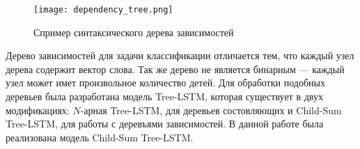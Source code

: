 \begin{figure}[h]
\centering
  \texttt{[image: dependency\_tree.png]}
  \caption{Спример синтаксического дерева зависимостей}\label{fig:overview:dependency_tree}
\end{figure}

Дерево зависимостей для задачи классификации отличается тем, что каждый узел дерева содержит вектор слова. Так же дерево не является бинарным --- каждый узел может имет произвольное количество детей. Для обработки подобных деревьев была разработана модель Tree-LSTM, которая существует в двух модификациях: $N$-арная Tree-LSTM, для деревьев состовляющих и Child-Sum Tree-LSTM, для работы с деревъями зависимостей. В данной работе была реализована модель Child-Sum Tree-LSTM.